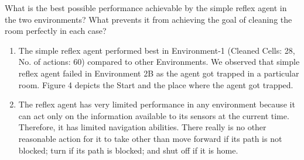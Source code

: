 \documentclass{article}
\newenvironment{Question}[2][Question]{\begin{trivlist}
\item[\hskip \labelsep {\bfseries #1}\hskip \labelsep {\bfseries #2.}]}{\end{trivlist}}
\begin{document}
\begin{Question}{3}What is the best possible performance achievable by the simple reflex agent in the two environments? What prevents it from achieving the goal of cleaning the room perfectly in each case?\\

\begin{enumerate}
\item The simple reflex agent performed best in Environment-1 (Cleaned Cells: 28, No. of actions: 60) compared to other  Environments.  We observed that simple reflex agent failed in Environment 2B as the agent got trapped in a particular room.  Figure 4 depicts the Start and the place where the agent got trapped.  
\item The reflex agent has very limited performance in any environment because it can act only on the information available to its sensors  at the current time. Therefore, it has limited navigation abilities. There really is no other reasonable action for it to take other than move forward if its path is not blocked; turn if its path is blocked; and shut off if it is home.
\end{enumerate}

\end{Question}
\end{document}
